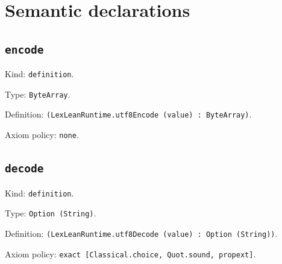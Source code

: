 \documentclass[11pt]{article}
\begin{document}
\section*{Semantic declarations}
\subsection*{\texttt{encode}}
\noindent Kind: \texttt{definition}.\par
\noindent Type: \texttt{ByteArray}.\par
\noindent Definition: \texttt{(LexLeanRuntime.utf8Encode (value) : ByteArray)}.\par
\noindent Axiom policy: \texttt{none}.\par
\subsection*{\texttt{decode}}
\noindent Kind: \texttt{definition}.\par
\noindent Type: \texttt{Option (String)}.\par
\noindent Definition: \texttt{(LexLeanRuntime.utf8Decode (value) : Option (String))}.\par
\noindent Axiom policy: \texttt{exact [Classical.choice, Quot.sound, propext]}.\par
\end{document}

